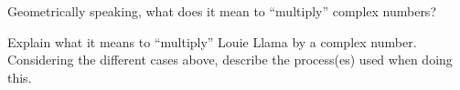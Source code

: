 \begin{prob} 
Geometrically speaking, what does it mean to ``multiply'' complex
numbers?
\end{prob}




\begin{prob}
Explain what it means to ``multiply'' Louie Llama by a complex
number. Considering the different cases above, describe the
process(es) used when doing this.
\end{prob}
